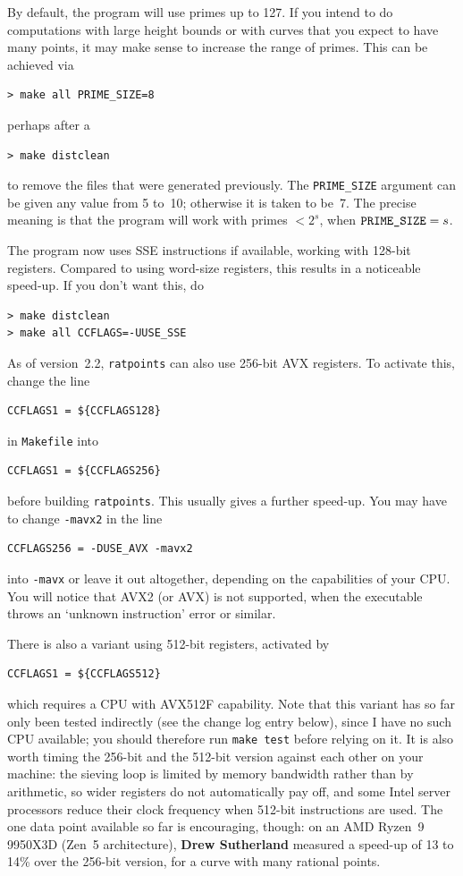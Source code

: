 \documentclass[12pt,a4paper,oneside]{amsart}
\begin{document}
By default, the program will use primes up to 127. If you intend to
do computations with large height bounds or with curves that you expect
to have many points, it may make sense to increase the range of primes.
This can be achieved via

\begin{verbatim}
> make all PRIME_SIZE=8
\end{verbatim}

perhaps after a

\begin{verbatim}
> make distclean
\end{verbatim}

to remove the files that were generated previously. The \texttt{PRIME\_SIZE}
argument can be given any value from 5 to~10; otherwise it is taken to be~7.
The precise meaning is that the program will work with primes $< 2^s$,
when $\text{\texttt{PRIME\_SIZE}} = s$.

The program now uses SSE instructions if available, working with 128-bit
registers. Compared to using word-size registers, this results in a noticeable
speed-up. If you don't want this, do
\begin{verbatim}
> make distclean
> make all CCFLAGS=-UUSE_SSE
\end{verbatim}

As of version~2.2, \texttt{ratpoints} can also use 256-bit AVX registers.
To activate this, change the line
\begin{verbatim}
CCFLAGS1 = ${CCFLAGS128}
\end{verbatim}
in \texttt{Makefile} into
\begin{verbatim}
CCFLAGS1 = ${CCFLAGS256}
\end{verbatim}
before building \texttt{ratpoints}. This usually gives a further speed-up.
You may have to change \verb+-mavx2+ in the line
\begin{verbatim}
CCFLAGS256 = -DUSE_AVX -mavx2
\end{verbatim}
into \verb+-mavx+ or leave it out altogether, depending on the capabilities
of your CPU. You will notice that AVX2 (or AVX) is not supported, when the
executable throws an `unknown instruction' error or similar.

There is also a variant using 512-bit registers, activated by
\begin{verbatim}
CCFLAGS1 = ${CCFLAGS512}
\end{verbatim}
which requires a CPU with AVX512F capability. Note that this variant has
so far only been tested indirectly (see the change log entry below), since
I have no such CPU available; you should therefore run \texttt{make test}
before relying on it. It is also worth timing the 256-bit and the 512-bit
version against each other on your machine: the sieving loop is limited by
memory bandwidth rather than by arithmetic, so wider registers do not
automatically pay off, and some Intel server processors reduce their clock
frequency when 512-bit instructions are used. The one data point available
so far is encouraging, though: on an AMD Ryzen~9 9950X3D (Zen~5 architecture),
\textbf{Drew Sutherland} measured a speed-up of 13 to 14\% over the 256-bit
version, for a curve with many rational points.
\end{document}
